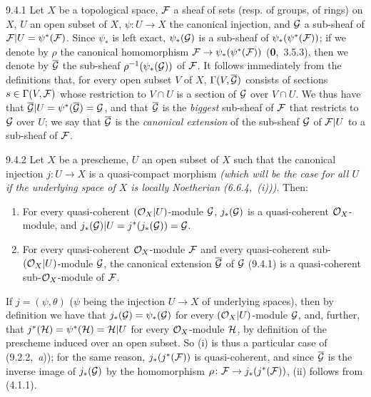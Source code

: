\documentclass[../main.tex]{subfiles}
\begin{document}
\begin{env}{9.4.1}
    Let $X$ be a topological space, $\mathcal{F}$ a sheaf of sets (resp. of groups, of rings) on $X$, $U$ an open subset of $X$, $\psi\colon U\to X$ the canonical injection, and $\mathcal{G}$ a sub-sheaf of $\mathcal{F}|U=\psi^*(\mathcal{F})$.
    Since $\psi_*$ is left exact, $\psi_*(\mathcal{G})$ is a sub-sheaf of $\psi_*(\psi^*(\mathcal{F}))$; if we denote by $\rho$ the canonical homomorphism $\mathcal{F}\to\psi_*(\psi^*(\mathcal{F}))$ (\textbf{0},~3.5.3), then we denote by $\overline{\mathcal{G}}$ the sub-sheaf $\rho^{-1}(\psi_*(\mathcal{G}))$ of $\mathcal{F}$.
    It follows immediately from the definitions that, for every open subset $V$ of $X$, $\Gamma(V,\overline{\mathcal{G}})$ consists of sections $s\in\Gamma(V,\mathcal{F})$ whose restriction to $V\cap U$ is a section of $\mathcal{G}$ over $V\cap U$.
    We thus have that $\overline{\mathcal{G}}|U=\psi^*(\overline{\mathcal{G}})=\mathcal{G}$, and that $\overline{\mathcal{G}}$ is the \emph{biggest} sub-sheaf of $\mathcal{F}$ that restricts to $\mathcal{G}$ over $U$; we say that $\overline{\mathcal{G}}$ is the \emph{canonical extension} of the sub-sheaf $\mathcal{G}$ of $\mathcal{F}|U$ to a sub-sheaf of $\mathcal{F}$.
\end{env}

\begin{env}[Proposition]{9.4.2}
    Let $X$ be a prescheme, $U$ an open subset of $X$ such that the canonical injection $j\colon U\to X$ is a quasi-compact morphism \emph{(which will be the case for \emph{all} $U$ if the underlying space of $X$ is \emph{locally Noetherian} {\normalfont(6.6.4,~(i))})}.
    Then:
    \begin{enumerate}[label=\normalfont(\roman*)]
        \item For every quasi-coherent $(\mathcal{O}_X|U)$-module $\mathcal{G}$, $j_*(\mathcal{G})$ is a quasi-coherent $\mathcal{O}_X$-module, and $j_*(\mathcal{G})|U=j^*(j_*(\mathcal{G}))=\mathcal{G}$.
        \item For every quasi-coherent $\mathcal{O}_X$-module $\mathcal{F}$ and every quasi-coherent sub-$(\mathcal{O}_X|U)$-module $\mathcal{G}$, the canonical extension $\overline{\mathcal{G}}$ of $\mathcal{G}$ {\normalfont(9.4.1)} is a quasi-coherent sub-$\mathcal{O}_X$-module of $\mathcal{F}$.
    \end{enumerate}
\end{env}

If $j=(\psi,\theta)$ ($\psi$ being the injection $U\to X$ of underlying spaces), then by definition we have that $j_*(\mathcal{G})=\psi_*(\mathcal{G})$ for every $(\mathcal{O}_X|U)$-module $\mathcal{G}$, and, further, that $j^*(\mathcal{H})=\psi^*(\mathcal{H})=\mathcal{H}|U$ for every $\mathcal{O}_X$-module $\mathcal{H}$, by definition of the prescheme induced over an open subset.
 So (i) is thus a particular case of (9.2.2,~\emph{a})); for the same reason, $j_*(j^*(\mathcal{F}))$ is quasi-coherent, and since $\overline{\mathcal{G}}$ is the inverse image of $j_*(\mathcal{G})$ by the homomorphism $\rho\colon\mathcal{F}\to j_*(j^*(\mathcal{F}))$, (ii) follows from (4.1.1).
 
\end{document}
